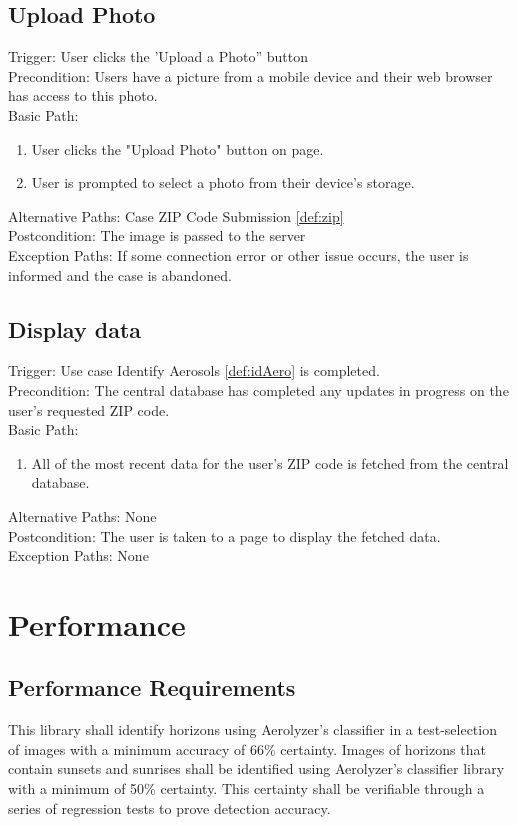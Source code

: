 \documentclass[journal,10pt,draftclsnofoot,onecolumn]{IEEEtran}
\begin{document}
\begin{singlespace}
	\subsection{Upload Photo} \label{def:upload}
		Trigger: User clicks the 'Upload a Photo” button\\
		Precondition: Users have a picture from a mobile device and their web browser has access to this photo.\\
		Basic Path:
		\begin{enumerate}
			\item User clicks the "Upload Photo" button on page.
			\item User is prompted to select a photo from their device's storage.
		\end{enumerate}
		Alternative Paths: Case ZIP Code Submission \ref{def:zip}\\
		Postcondition: The image is passed to the server\\
		Exception Paths: If some connection error or other issue occurs, the user is informed and the case is abandoned.
			
	\subsection{Display data}
		Trigger: Use case Identify Aerosols \ref{def:idAero} is completed.\\
		Precondition: The central database has completed any updates in progress on the user's requested ZIP code.\\
		Basic Path:
		\begin{enumerate}
			\item All of the most recent data for the user's ZIP code is fetched from the central database.
		\end{enumerate}
		Alternative Paths: None\\
		Postcondition: The user is taken to a page to display the fetched data.\\
		Exception Paths: None
\clearpage

\section{Performance}
	\subsection{Performance Requirements}
		This library shall identify horizons using Aerolyzer's classifier in a test-selection of images with a minimum accuracy of 66\% certainty.
		Images of horizons that contain sunsets and sunrises shall be identified using Aerolyzer's classifier library with a minimum of 50\% certainty.
		This certainty shall be verifiable through a series of regression tests to prove detection accuracy.


\end{singlespace}
\end{document}
